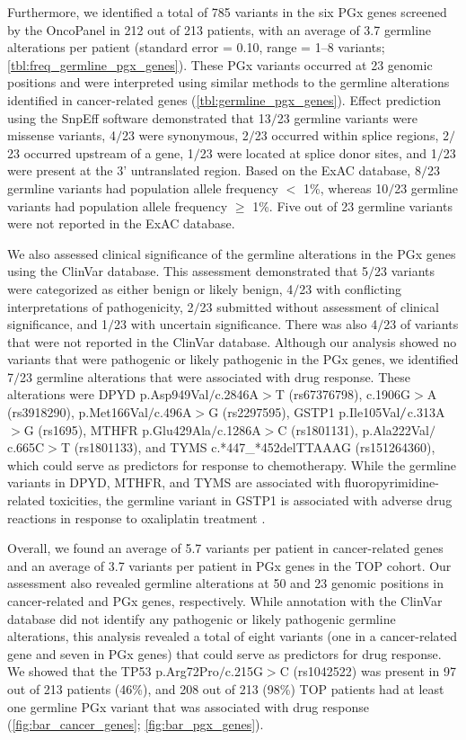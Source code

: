 Furthermore, we identified a total of 785 variants in the six PGx genes screened by the OncoPanel in 212 out of 213 patients, with an average of 3.7 germline alterations per patient (standard error = 0.10, range = 1--8 variants; \autoref{tbl:freq_germline_pgx_genes}). These PGx variants occurred at 23 genomic positions and were interpreted using similar methods to the germline alterations identified in cancer-related genes (\autoref{tbl:germline_pgx_genes}). Effect prediction using the SnpEff software demonstrated that 13$/$23 germline variants were missense variants, 4$/$23 were synonymous, 2$/$23 occurred within splice regions, 2$/$23 occurred upstream of a gene, 1$/$23 were located at splice donor sites, and 1$/$23 were present at the 3' untranslated region. Based on the ExAC database, 8$/$23 germline variants had population allele frequency $<$ 1\%, whereas 10$/$23 germline variants had population allele frequency $\geq$ 1\%. Five out of 23 germline variants were not reported in the ExAC database.

We also assessed clinical significance of the germline alterations in the PGx genes using the ClinVar database. This assessment demonstrated that 5$/$23 variants were categorized as either benign or likely benign, 4$/$23 with conflicting interpretations of pathogenicity, 2$/$23 submitted without assessment of clinical significance, and 1$/$23 with uncertain significance. There was also 4$/$23 of variants that were not reported in the ClinVar database. Although our analysis showed no variants that were pathogenic or likely pathogenic in the PGx genes, we identified 7$/$23 germline alterations that were associated with drug response. These alterations were \acs{DPYD} p.Asp949Val$/$c.2846A$>$T (rs67376798), c.1906G$>$A (rs3918290), p.Met166Val$/$c.496A$>$G (rs2297595), \acs{GSTP1} p.Ile105Val$\\/$c.313A$>$G (rs1695), \acs{MTHFR} p.Glu429Ala$/$c.1286A$>$C (rs1801131), p.Ala222Val$/$c.665C$>$T (rs1801133), and \acs{TYMS} c.*447\_*452delTTAAAG (rs151264360), which could serve as predictors for response to chemotherapy. While the germline variants in \acs{DPYD}, \acs{MTHFR}, and \acs{TYMS} are associated with fluoropyrimidine-related toxicities, the germline variant in \acs{GSTP1} is associated with adverse drug reactions in response to oxaliplatin treatment \cite{Panczyk2014, Mohelnikova-Duchonova2014}.

Overall, we found an average of 5.7 variants per patient in cancer-related genes and an average of 3.7 variants per patient in PGx genes in the TOP cohort. Our assessment also revealed germline alterations at 50 and 23 genomic positions in cancer-related and PGx genes, respectively. While annotation with the ClinVar database did not identify any pathogenic or likely pathogenic germline alterations, this analysis revealed a total of eight variants (one in a cancer-related gene and seven in PGx genes) that could serve as predictors for drug response. We showed that the \acs{TP53} p.Arg72Pro$/$c.215G$>$C (rs1042522) was present in 97 out of 213 patients (46\%), and 208 out of 213 (98\%) TOP patients had at least one germline PGx variant that was associated with drug response (\autoref{fig:bar_cancer_genes}; \autoref{fig:bar_pgx_genes}).


